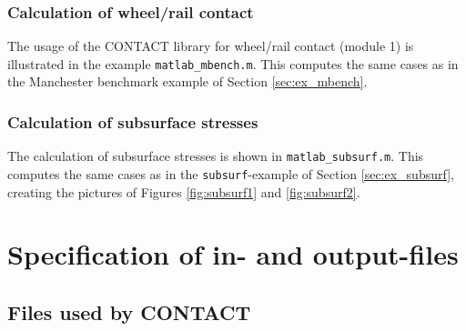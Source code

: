\documentclass[12pt]{report}
\begin{document}
\subsection{Calculation of wheel/rail contact}
\label{sec:clib_mbench}

The usage of the CONTACT library for wheel/rail contact (module 1) is
illustrated in the example {\tt matlab\_mbench.m}. This computes the same
cases as in the Manchester benchmark example of Section
\ref{sec:ex_mbench}.

\subsection{Calculation of subsurface stresses}
\label{sec:clib_ex_subs}

The calculation of subsurface stresses is shown in {\tt matlab\_subsurf.m}. 
This computes the same cases as in the {\tt subsurf}-example of Section
\ref{sec:ex_subsurf}, creating the pictures of Figures \ref{fig:subsurf1} and
\ref{fig:subsurf2}.

\color{black}


\clearpage





\clearpage
\appendix

\chapter{Specification of in- and output-files}
\label{chp:fileformats}

\section{Files used by CONTACT}
\end{document}
